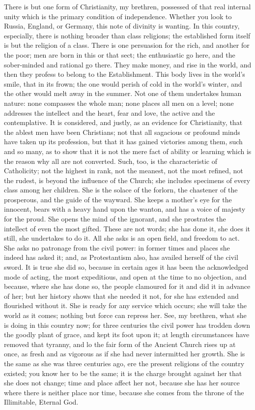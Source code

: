 There is but one form of Christianity, my brethren, possessed of
that real internal unity which is the primary condition of
independence. Whether you look to Russia, England, or Germany, this
note of divinity is wanting. In this country, especially, there is
nothing broader than class religions; the established form itself is
but the religion of a class. There is one persuasion for the rich, and
another for the poor; men are born in this or that sect; the
enthusiastic go here, and the sober-minded and rational go there. They
make money, and rise in the world, and then they profess to belong to
the Establishment. This body lives in the world's smile, that in its
frown; the one would perish of cold in the world's winter, and the
other would melt away in the summer. Not one of them undertakes human
nature: none compasses the whole man; none places all men on a level;
none addresses the intellect and the heart, fear and love, the active
and the contemplative. It is considered, and justly, as an evidence
for Christianity, that the ablest men have been Christians; not that
all sagacious or profound minds have taken up its profession, but that
it has gained victories among them, such and so many, as to show that
it is not the mere fact of ability or learning which is the reason why
all are not converted. Such, too, is the characteristic of
Catholicity; not the highest in rank, not the meanest, not the most
refined, not the rudest, is beyond the influence of the Church; she
includes specimens of every class among her children. She is the
solace of the forlorn, the chastener of the prosperous, and the guide
of the wayward. She keeps a mother's eye for the innocent, bears with
a heavy hand upon the wanton, and has a voice of majesty for the
proud. She opens the mind of the ignorant, and she prostrates the
intellect of even the most gifted. These are not words; she has done
it, she does it still, she undertakes to do it. All she asks is an
open field, and freedom to act. She asks no patronage from the civil
power: in former times and places she indeed has asked it; and, as
Protestantism also, has availed herself of the civil sword. It is true
she did so, because in certain ages it has been the acknowledged mode
of acting, the most expeditious, and open at the time to no objection,
and because, where she has done so, the people clamoured for it and
did it in advance of her; but her history shows that she needed it
not, for she has extended and flourished without it. She is ready for
any service which occurs; she will take the world as it comes; nothing
but force can repress her. See, my brethren, what she is doing in this
country now; for three centuries the civil power has trodden down the
goodly plant of grace, and kept its foot upon it; at length
circumstances have removed that tyranny, and lo the fair form of the
Ancient Church rises up at once, as fresh and as vigorous as if she
had never intermitted her growth. She is the same as she was three
centuries ago, ere the present religions of the country existed; you
know her to be the same; it is the charge brought against her that she
does not change; time and place affect her not, because she has her
source where there is neither place nor time, because she comes from
the throne of the Illimitable, Eternal God.

